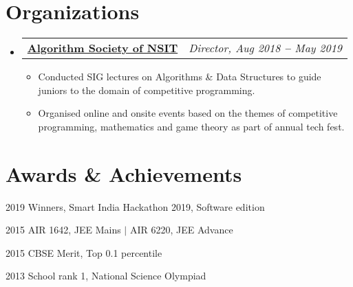 \documentclass[letterpaper,11pt]{article}
\makeatletter
\newcommand{\resumeItem}[1]{
  \item\small{
    {#1 \vspace{-2pt}}
  }
}
\newcommand{\resumeOrganizationHeading}[2]{
  \vspace{-2pt}\item
    \begin{tabular*}{0.97\textwidth}[t]{l@{\extracolsep{\fill}}r}
      \textbf{#1} & \textit{\small #2} \\
    \end{tabular*}\vspace{-7pt}
}
\newcommand{\resumeSubHeadingListStart}{\begin{itemize}[leftmargin=0.15in, label={}]}
\newcommand{\resumeSubHeadingListEnd}{\end{itemize}}
\newcommand{\resumeItemListStart}{\begin{itemize}}
\newcommand{\resumeItemListEnd}{\end{itemize}\vspace{-5pt}}
\makeatother
\begin{document}

\section{Organizations}
\resumeSubHeadingListStart

\resumeOrganizationHeading
{\href{https://www.facebook.com/AlgorithmSocietyOfNSIT/}{Algorithm Society of NSIT}}
{Director, Aug 2018 \textbf{--} May 2019}
\resumeItemListStart
\resumeItem{Conducted SIG lectures on Algorithms \& Data Structures to guide juniors to the domain of competitive programming.}
\resumeItem{Organised online and onsite events based on the themes of competitive programming, mathematics and game theory as part of annual tech fest.}
\resumeItemListEnd

\resumeSubHeadingListEnd



\section{Awards \& Achievements}
\vspace{2pt}
\resumeSubHeadingListStart
\small{\item{
	2019 \hspace{10pt} Winners, Smart India Hackathon 2019, Software edition
	\\ \vspace{3pt}
	
	2015 \hspace{10pt} AIR 1642, JEE Mains $|$ AIR 6220, JEE Advance
	\\ \vspace{3pt}
	
	2015 \hspace{10pt} CBSE Merit, Top 0.1 percentile
	\\ \vspace{3pt}
	
	2013 \hspace{10pt} School rank 1, National Science Olympiad
	\\ \vspace{3pt}
	
}}
\resumeSubHeadingListEnd


\end{document}
